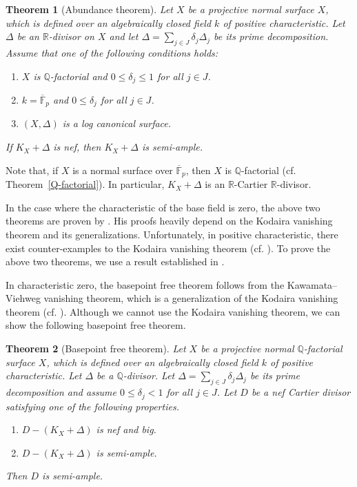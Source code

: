 \documentclass[12pt,twoside]{amsart}
\newtheorem{thm}{Theorem}[section]
\theoremstyle{definition}
\newcommand{\Q}{$\mathbb{Q}$}
\newcommand{\R}{$\mathbb{R}$}
\begin{document}
\begin{thm}[Abundance theorem]\label{0abundance}
Let $X$ be a projective normal surface $X$, 
which is defined over an algebraically closed field $k$ of positive characteristic. 
Let $\Delta$ be an $\mathbb{R}$-divisor on $X$ and 
let $\Delta=\sum_{j\in J}\delta_j\Delta_j$ be its prime decomposition. 
Assume that one of the following conditions holds{\em{:}}
\begin{enumerate}
\item[(QF)]{$X$ is \Q-factorial and $0\leq \delta_j\leq 1$ for all $j\in J$.}
\item[(FP)]{$k=\overline{\mathbb{F}}_p$ and $0\leq\delta_j$ for all $j\in J$.}
\item[(LC)]{$(X, \Delta)$ is a log canonical surface.}
\end{enumerate}
If $K_X+\Delta$ is nef, then $K_X+\Delta$ is semi-ample. 
\end{thm}


Note that, if $X$ is a normal surface over $\overline{\mathbb{F}}_p$,
then $X$ is \Q-factorial (cf. Theorem~\ref{Q-factorial}). 
In particular, $K_X+\Delta$ is an \R-Cartier \R-divisor. 

In the case where the characteristic of the base field is zero, 
the above two theorems are proven by \cite{Fujino}. 
His proofs heavily depend on the Kodaira vanishing theorem and its generalizations. 
Unfortunately, in positive characteristic, 
there exist counter-examples to the Kodaira vanishing theorem (cf. \cite{Raynaud}). 
To prove the above two theorems, we use a result established in \cite{Keel}. 

In characteristic zero, 
the basepoint free theorem follows from the Kawamata--Viehweg vanishing theorem, 
which is a generalization of the Kodaira vanishing theorem (cf. \cite[Theorem~3.3]{KM}). 
Although we cannot use the Kodaira vanishing theorem, 
we can show the following basepoint free theorem. 

\begin{thm}[Basepoint free theorem]\label{0bpf}
Let $X$ be a projective normal \Q-factorial surface $X$, 
which is defined over an algebraically closed field $k$ of positive characteristic. 
Let $\Delta$ be a $\mathbb{Q}$-divisor. 
Let $\Delta=\sum_{j\in J}\delta_j\Delta_j$ be 
its prime decomposition and assume $0\leq \delta_j<1$ for all $j\in J$. 
Let $D$ be a nef Cartier divisor satisfying one of the following properties. 
\begin{enumerate}
\item{$D-(K_X+\Delta)$ is nef and big.} 
\item{$D-(K_X+\Delta)$ is semi-ample.}
\end{enumerate}
Then $D$ is semi-ample. 
\end{thm}
\end{document}
